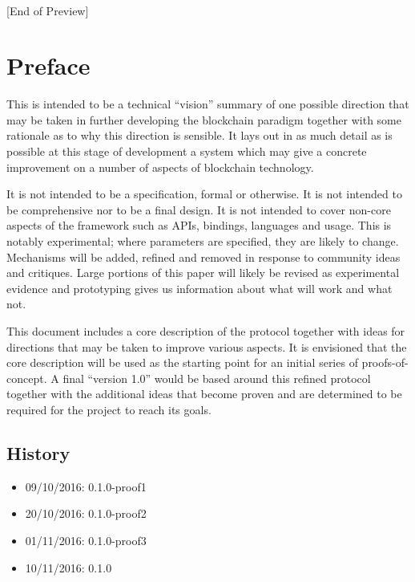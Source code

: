 \documentclass[t,usepdftitle=false]{beamer}
\begin{document}
\begin{frame}
\frametitle{\phantom{}}
\vfill
\centering
\LARGE
\mbox{}\\
{[}End of Preview{]}
\vfill


\section{Preface}\label{preface}

 This is intended to be a technical ``vision'' summary of one possible direction that may be taken in further developing the blockchain paradigm together with some rationale as to why this direction is sensible. It lays out in as much detail as is possible at this stage of development a system which may give a concrete improvement on a number of aspects of blockchain technology.

 It is not intended to be a specification, formal or otherwise. It is not intended to be comprehensive nor to be a final design. It is not intended to cover non-core aspects of the framework such as APIs, bindings, languages and usage. This is notably experimental; where parameters are specified, they are likely to change. Mechanisms will be added, refined and removed in response to community ideas and critiques. Large portions of this paper will likely be revised as experimental evidence and prototyping gives us information about what will work and what not.

 This document includes a core description of the protocol together with ideas for directions that may be taken to improve various aspects. It is envisioned that the core description will be used as the starting point for an initial series of proofs-of-concept. A final ``version 1.0'' would be based around this refined protocol together with the additional ideas that become proven and are determined to be required for the project to reach its goals.

\subsection{History}\label{history}

\begin{itemize}
\item 09/10/2016: 0.1.0-proof1
\item 20/10/2016: 0.1.0-proof2
\item 01/11/2016: 0.1.0-proof3
\item 10/11/2016: 0.1.0
\end{itemize}


\end{frame}
\end{document}
